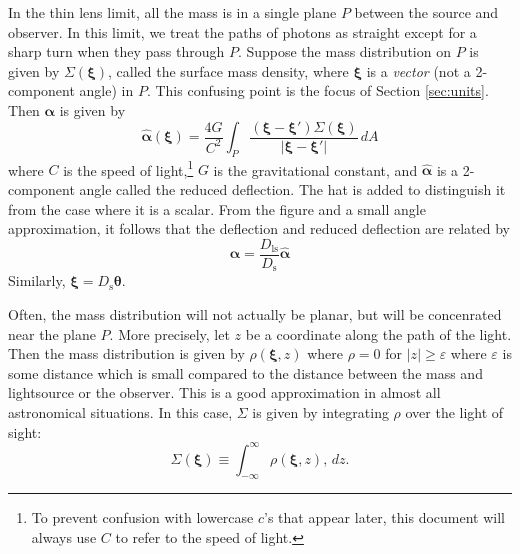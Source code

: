 \documentclass[10pt,twoside]{article}
\theoremstyle{definition}
\theoremstyle{exercise}
\newcommand{\n}[1]{\left| #1 \right|}%
\renewcommand{\v}[1]{\boldsymbol{#1}}%
\begin{document}
In the thin lens limit, all the mass is in a single plane $P$ between the source and observer. In this limit, we treat the paths of photons as straight except for a sharp turn when they pass through $P$. Suppose the mass distribution on $P$ is given by $\Sigma(\v{\xi})$, called the surface mass density, where $\v{\xi}$ is a \emph{vector} (not a 2-component angle) in $P$. This confusing point is the focus of Section \ref{sec:units}. Then $\v{\alpha}$ is given by \cite{Narayan:1996ba}
\begin{equation}
		\hat{\v{\alpha}}(\v{\xi}) = \frac{4G}{C^2} \int_P \frac{\left( \v{\xi} - \v{\xi}' \right)\Sigma(\v{\xi})}{\n{\v{\xi} - \v{\xi}'}} \, dA
		\label{eq:thin_lens_deflection}
\end{equation}
where $C$ is the speed of light,\footnote{To prevent confusion with lowercase $c$'s that appear later, this document will always use $C$ to refer to the speed of light.} $G$ is the gravitational constant, and $\hat{\v{\alpha}}$ is a 2-component angle called the reduced deflection. The hat is added to distinguish it from the case where it is a scalar. From the figure and a small angle approximation, it follows that the deflection and reduced deflection are related by
\begin{equation}
		\v{\alpha} = \frac{D_\text{ls}}{D_\text{s}} \hat{\v{\alpha}}
		\label{eq:reduced_deflection}
\end{equation}
Similarly, $\v{\xi} = D_\text{s} \v{\theta}$.

Often, the mass distribution will not actually be planar, but will be concenrated near the plane $P$. More precisely, let $z$ be a coordinate along the path of the light. Then the mass distribution is given by $\rho(\v{\xi}, z)$ where $\rho = 0$ for $\n{z} \ge \varepsilon$ where $\varepsilon$ is some distance which is small compared to the distance between the mass and lightsource or the observer. This is a good approximation in almost all astronomical situations. In this case, $\Sigma$ is given by integrating $\rho$ over the light of sight:
\begin{equation}
		\Sigma(\v{\xi}) \equiv \int_{-\infty}^\infty \rho(\v{\xi}, z), \, dz.
		\label{eq:LOS_approx}
\end{equation}
\end{document}
